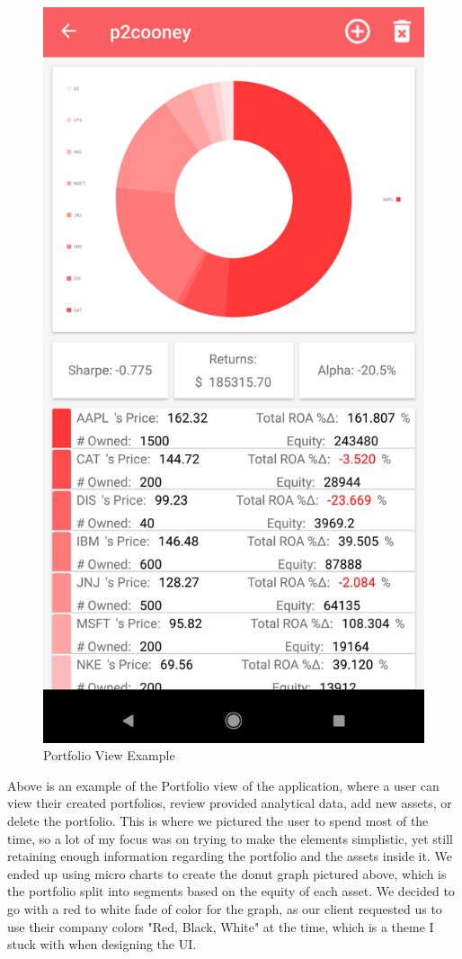\documentclass[letterpaper,10pt,titlepage,journal,compsoc,draftclsnofoot,onecolumn]{IEEEtran}
\begin{document}
\begin{figure}[h]
   \caption{Portfolio View Example}
   \centering
   \includegraphics[scale=.65]{spring_portfolio_screenshot}
\end{figure}

Above is an example of the Portfolio view of the application, where a user can view their created portfolios, review provided analytical data, add new assets, or delete the portfolio. This is where we pictured the user to spend most of the time, so a lot of my focus was on trying to make the elements simplistic, yet still retaining enough information regarding the portfolio and the assets inside it. We ended up using micro charts to create the donut graph pictured above, which is the portfolio split into segments based on the equity of each asset. We decided to go with a red to white fade of color for the graph, as our client requested us to use their company colors "Red, Black, White" at the time, which is a theme I stuck with when designing the UI.
\end{document}
